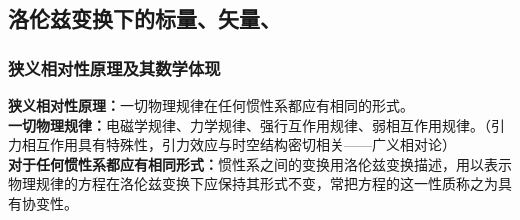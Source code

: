 \subsection{洛伦兹变换下的标量、矢量、  }
\subsubsection{狭义相对性原理及其数学体现}
\textbf{狭义相对性原理：}一切物理规律在任何惯性系都应有相同的形式。\\
\textbf{一切物理规律：}电磁学规律、力学规律、强行互作用规律、弱相互作用规律。（引力相互作用具有特殊性，引力效应与时空结构密切相关——广义相对论）\\
\textbf{对于任何惯性系都应有相同形式：}惯性系之间的变换用洛伦兹变换描述，用以表示物理规律的方程在洛伦兹变换下应保持其形式不变，常把方程的这一性质称之为具有协变性。\\
